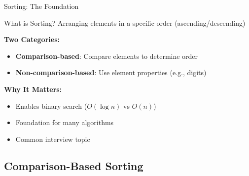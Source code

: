 \documentclass[aspectratio=169,xcolor=dvipsnames]{beamer}
\begin{document}
\begin{frame}{Sorting: The Foundation}
  \begin{block}{What is Sorting?}
    Arranging elements in a specific order (ascending/descending)
  \end{block}

  \textbf{Two Categories:}
  \begin{itemize}
    \item \textbf{Comparison-based}: Compare elements to determine order
    \item \textbf{Non-comparison-based}: Use element properties (e.g., digits)
  \end{itemize}

  \vspace{0.3cm}
  \textbf{Why It Matters:}
  \begin{itemize}
    \item Enables binary search ($O(\log n)$ vs $O(n)$)
    \item Foundation for many algorithms
    \item Common interview topic
  \end{itemize}
\end{frame}

\subsection{Comparison-Based Sorting}
\end{document}
